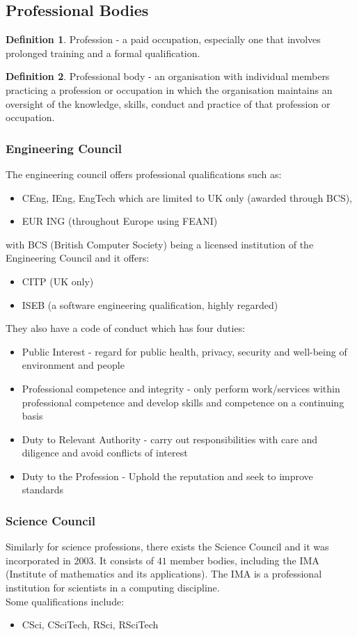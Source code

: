 \documentclass[a4paper]{article}
\theoremstyle{plain}
\theoremstyle{definition}
\newtheorem{defn}{Definition}[section]
\theoremstyle{remark}
\begin{document}
\subsection{Professional Bodies}
\begin{defn}
	Profession - a paid occupation, especially one that involves prolonged training and a formal qualification.
\end{defn}
\begin{defn}
	Professional body - an organisation with individual members practicing a profession or occupation in which the organisation maintains an oversight of the knowledge, skills, conduct and practice of that profession or occupation.
\end{defn}
\subsubsection{Engineering Council}
The engineering council offers professional qualifications such as:
\begin{itemize}
	\item CEng, IEng, EngTech which are limited to UK only (awarded through BCS), 
	\item EUR ING (throughout Europe using FEANI)
\end{itemize}
with BCS (British Computer Society) being a licensed institution of the Engineering Council and it offers:
\begin{itemize}
	\item CITP (UK only)
	\item ISEB (a software engineering qualification, highly regarded)
\end{itemize}
They also have a code of conduct which has four duties:
\begin{itemize}
	\item Public Interest - regard for public health, privacy, security and well-being of environment and people
	\item Professional competence and integrity - only perform work/services within professional competence and develop skills and competence on a continuing basis
	\item Duty to Relevant Authority - carry out responsibilities with care and diligence and avoid conflicts of interest
	\item Duty to the Profession - Uphold the reputation and seek to improve standards
\end{itemize}

\subsubsection{Science Council}
Similarly for science professions, there exists the Science Council and it was incorporated in 2003. It consists of $41$ member bodies, including the IMA (Institute of mathematics and its applications). The IMA is a professional institution for scientists in a computing discipline. \\
Some qualifications include:
\begin{itemize}
	\item CSci, CSciTech, RSci, RSciTech
\end{itemize}
\end{document}
